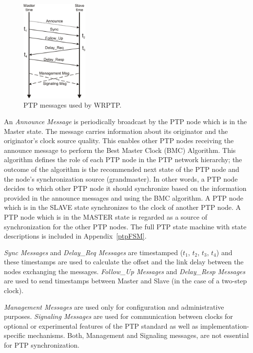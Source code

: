 \documentclass[a4paper, 12pt]{article}
\begin{document}
\begin{figure}[ht!]
  \centering
  \includegraphics[width=0.30\textwidth]{protocol/ptpMSGs.pdf}
  \caption{PTP messages used by WRPTP.}
  \label{fig:wrPTPmsgs}
\end{figure}

An \textit{Announce Message} is periodically broadcast by the PTP node which is 
in the Master state. The message carries information about its originator and 
the originator's clock source quality. This enables other PTP nodes receiving 
the announce message to perform the Best Master Clock (BMC) Algorithm. 
This algorithm defines the role of each PTP node in the PTP network hierarchy; 
the outcome of the algorithm is the recommended next state of the PTP node and 
the node's synchronization source (grandmaster). In other words, a PTP node 
decides to which other PTP node it should synchronize based on the information 
provided in the announce messages and using the BMC algorithm. A PTP node which is in 
the SLAVE state synchronizes to the clock of another PTP node. A PTP node 
which is in the MASTER state is regarded as a source of synchronization 
for the other PTP nodes. The full PTP state machine with state descriptions 
is included in Appendix~\ref{ptpFSM}.



\textit{Sync Messages} and \textit{Delay\_Req Messages} are timestamped 
($t_{1}$, $t_{2}$, $t_{3}$, $t_{4}$) and these timestamps are used to calculate 
the offset and the link delay between the nodes exchanging the messages. \textit{Follow\_Up Messages} 
and \textit{Delay\_Resp Messages} are used to send timestamps between Master 
and Slave (in the case of a two-step clock). 

\textit{Management Messages} are used only for configuration and 
administrative purposes. \textit{Signaling Messages} are used for communication between clocks 
for optional or experimental features of the PTP standard as well as implementation-specific 
mechanisms. Both, Management and Signaling messages, are not essential for PTP synchronization.
\end{document}
